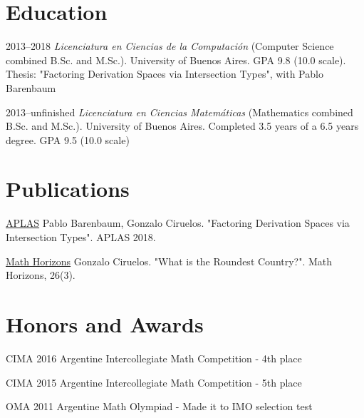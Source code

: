 \documentclass[a4paper,english,10pt]{article}
\begin{document}
\section{Education}
\begin{CV}
\item[2013--2018] \textit{Licenciatura en Ciencias de la Computación} (Computer Science combined B.Sc. and M.Sc.). University of Buenos Aires. GPA 9.8 (10.0 scale). Thesis: "Factoring Derivation Spaces via Intersection Types", with Pablo Barenbaum
\item[2013--unfinished] \textit{Licenciatura en Ciencias Matemáticas} (Mathematics combined B.Sc. and M.Sc.). University of Buenos Aires. Completed 3.5 years of a 6.5 years degree. GPA 9.5 (10.0 scale)
\end{CV}


\section{Publications}
\begin{CV}
\item[\href{https://doi.org/10.1007/978-3-030-02768-1_2}{APLAS}] Pablo Barenbaum, Gonzalo Ciruelos. "Factoring Derivation Spaces via Intersection Types". APLAS 2018.
\item[\href{https://doi.org/10.1080/10724117.2018.1524089}{Math Horizons}] Gonzalo Ciruelos. "What is the Roundest Country?".  Math Horizons, 26(3).
\end{CV}


\section{Honors and Awards}
\begin{CV}
\item [CIMA 2016] Argentine Intercollegiate Math Competition - 4th place
\item [CIMA 2015] Argentine Intercollegiate Math Competition - 5th place
\item [OMA 2011] Argentine Math Olympiad - Made it to IMO selection test
\end{CV}
\end{document}
